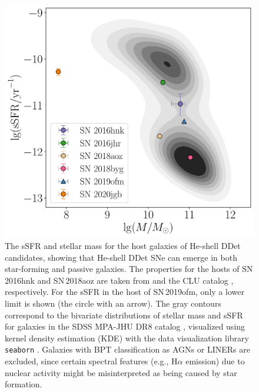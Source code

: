 \documentclass[twocolumn]{aastex631}
\begin{document}
\begin{figure}
    \centering
    \includegraphics[width=\linewidth]{host.pdf}
    \caption{The sSFR and stellar mass for the host galaxies of He-shell DDet candidates, showing that He-shell DDet SNe can emerge in both star-forming and passive galaxies. The properties for the hosts of SN\,2016hnk and SN\,2018aoz are taken from \citet{Dong_Ca-rich_2022} and the CLU catalog \citep{Cook_2019, de_Ca_rich_2020}, respectively. For the sSFR in the host of SN\,2019ofm, only a lower limit is shown (the circle with an arrow). The gray contours correspond to the bivariate distributions of stellar mass and sSFR for galaxies in the SDSS MPA-JHU DR8 catalog \citep{Kauffmann_SDSS_2003,Brinchmann_SDSS_2004}, visualized using kernel density estimation (KDE) with the data visualization library \texttt{seaborn} \citep{Waskom_seaborn_2021}. Galaxies with BPT classification as AGNs or LINERs are excluded, since certain spectral features (e.g., H$\alpha$ emission) due to nuclear activity might be misinterpreted as being caused by star formation.}
    \label{fig:host}
\end{figure}
\end{document}
